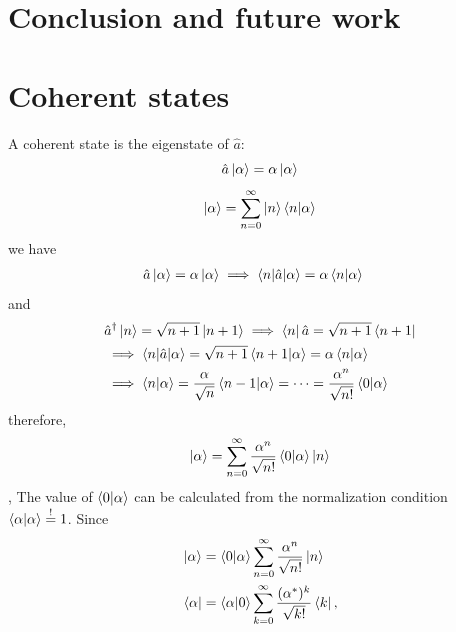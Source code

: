 \documentclass[12pt, a4paper,  nobibnotes]{article}
\begin{document}
\section{Conclusion and future work}


%
%


\appendix
\section{Coherent states}
\label{appendix:coherent}
A coherent state is the eigenstate of $\hat a$:
\begin{equation*}
    \hat a \ket{\alpha} = \alpha\ket{\alpha}
\end{equation*}
\begin{align*}
    \ket\alpha = \sum\limits_{n=0}^{\infty}\ket n\braket{n|\alpha}
\end{align*}
we have
\begin{align*}
    &\hat a\ket\alpha = \alpha\ket\alpha \implies \braket{n|\hat a|\alpha}=\alpha\braket{n|\alpha}
\end{align*}
and 
\begin{align*}
    &\hat a^{\dagger}\ket n = \sqrt{n+1}\ket{n+1} \implies \bra n \hat a = \sqrt{n+1}\bra{n+1}\\
    &\implies \braket{n|\hat a|\alpha} = \sqrt{n+1}\braket{n+1|\alpha} = \alpha\braket{n|\alpha}\\
    &\implies \braket{n|\alpha} = \frac{\alpha}{\sqrt n}\braket{n-1|\alpha} = \dots = \frac{\alpha^n}{\sqrt{n!}}
    \braket{0|\alpha}
\end{align*}
therefore,
\begin{align*}
    \ket\alpha = \sum\limits_{n=0}^{\infty}\frac{\alpha^n}{\sqrt{n!}}\braket{0|\alpha}\ket n
\end{align*},
The value of $\braket{0|\alpha}$ can be calculated from the normalization condition
$\braket{\alpha|\alpha}\overset{!}{=}1$. Since
\begin{align*}
    &\ket\alpha = \braket{0|\alpha}\sum\limits_{n=0}^{\infty}\frac{\alpha^n}{\sqrt{n!}}\ket n \\ 
    &\bra\alpha = \braket{\alpha|0}\sum\limits_{k=0}^{\infty}\frac{(\alpha^*)^k}{\sqrt{k!}}\bra k,
\end{align*}
\end{document}
